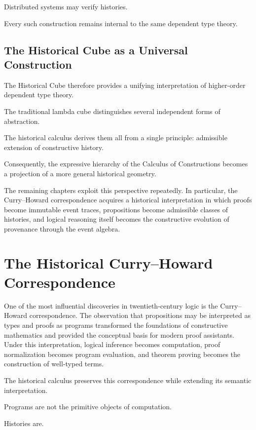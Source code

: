 \documentclass[12pt,oneside]{article}
\theoremstyle{definition}
\theoremstyle{remark}
\begin{document}
Distributed systems may verify histories.

Every such construction remains internal to the same dependent type theory.

\subsection{The Historical Cube as a Universal Construction}

The Historical Cube therefore provides a unifying interpretation of higher-order
dependent type theory.

The traditional lambda cube distinguishes several independent forms of
abstraction.

The historical calculus derives them all from a single principle: admissible
extension of constructive history.

Consequently, the expressive hierarchy of the Calculus of Constructions becomes
a projection of a more general historical geometry.

The remaining chapters exploit this perspective repeatedly. In particular, the
Curry--Howard correspondence acquires a historical interpretation in which
proofs become immutable event traces, propositions become admissible classes of
histories, and logical reasoning itself becomes the constructive evolution of
provenance through the event algebra.

\section{The Historical Curry--Howard Correspondence}

One of the most influential discoveries in twentieth-century logic is the
Curry--Howard correspondence. The observation that propositions may be
interpreted as types and proofs as programs transformed the foundations of
constructive mathematics and provided the conceptual basis for modern proof
assistants. Under this interpretation, logical inference becomes computation,
proof normalization becomes program evaluation, and theorem proving becomes the
construction of well-typed terms.

The historical calculus preserves this correspondence while extending its
semantic interpretation.

Programs are not the primitive objects of computation.

Histories are.
\end{document}
